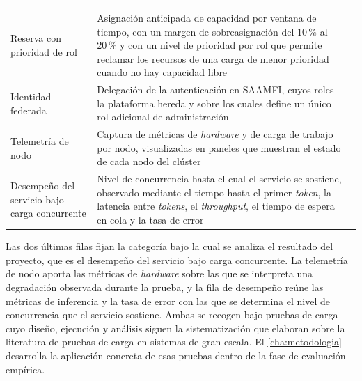 {\begin{xltabular}{\textwidth}{p{0.18\textwidth} X p{0.13\textwidth}}
         \\
        \addlinespace
        Reserva con prioridad de rol &
        Asignación anticipada de capacidad por ventana de tiempo, con un margen de sobreasignación del 10\,\% al 20\,\% y con un nivel de prioridad por rol que permite reclamar los recursos de una carga de menor prioridad cuando no hay capacidad libre &
         \\
        \addlinespace
        Identidad federada &
        Delegación de la autenticación en SAAMFI, cuyos roles la plataforma hereda y sobre los cuales define un único rol adicional de administración &
         \\
        \addlinespace
        Telemetría de nodo &
        Captura de métricas de \emph{hardware} y de carga de trabajo por nodo, visualizadas en paneles que muestran el estado de cada nodo del clúster &
         \\
        \addlinespace
        Desempeño del servicio bajo carga concurrente &
        Nivel de concurrencia hasta el cual el servicio se sostiene, observado mediante el tiempo hasta el primer \emph{token}, la latencia entre \emph{tokens}, el \emph{throughput}, el tiempo de espera en cola y la tasa de error &
         \\
\end{xltabular}
}

Las dos últimas filas fijan la categoría bajo la cual se analiza el resultado del proyecto, que es el desempeño del servicio bajo carga concurrente. La telemetría de nodo aporta las métricas de \emph{hardware} sobre las que se interpreta una degradación observada durante la prueba, y la fila de desempeño reúne las métricas de inferencia y la tasa de error con las que se determina el nivel de concurrencia que el servicio sostiene. Ambas se recogen bajo pruebas de carga cuyo diseño, ejecución y análisis siguen la sistematización que \citet{jiang-loadtestingsurvey-2015} elaboran sobre la literatura de pruebas de carga en sistemas de gran escala. El \cref{cha:metodologia} desarrolla la aplicación concreta de esas pruebas dentro de la fase de evaluación empírica.
